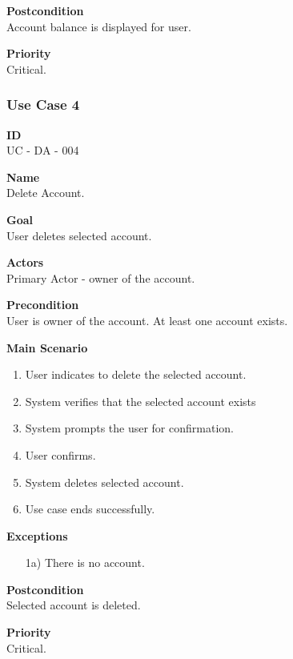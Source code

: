 \documentclass[12pt]{article}
\begin{document}
\noindent
{\bf Postcondition}\\
Account balance is displayed for user.

\noindent
{\bf Priority}\\
Critical.

\subsubsection{Use Case 4} \label{uc:4}

\noindent
{\bf ID}\\
UC - DA - 004

\noindent
{\bf Name}\\
Delete Account.

\noindent
{\bf Goal}\\
User deletes selected account.

\noindent
{\bf Actors}\\
Primary Actor - owner of the account.

\noindent
{\bf Precondition}\\
User is owner of the account.
At least one account exists.

\noindent
{\bf Main Scenario}\\
\vspace*{-0.2in}
\begin{enumerate}
\item User indicates to delete the selected account.
\item System verifies that the selected account exists
\item System prompts the user for confirmation.
\item User confirms.
\item System deletes selected account.
  \item Use case ends successfully.
\end{enumerate}

\noindent
    {\bf Exceptions}\\
    \vspace{-0.2in}
    \begin{itemize}
    \item[1a)] There is no account.
    \end{itemize}

\noindent
{\bf Postcondition}\\
Selected account is deleted.

\noindent
{\bf Priority}\\
Critical.
\end{document}
